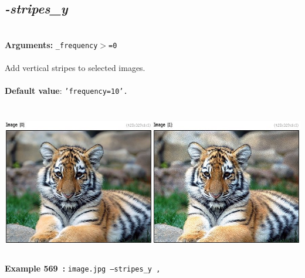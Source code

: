 \documentclass[a4paper,11pt,twoside]{book}
\begin{document}
\subsection{\emph{-stripes\_y} }\vspace*{-0.5em}
~\\\textbf{Arguments: } 
{\small \texttt{\_frequency$>$=0}}\\~\\
Add vertical stripes to selected images.
~\\~\\\textbf{Default value}: {\small \texttt{'frequency=10'.}}
\begin{center}\includegraphics[keepaspectratio=true,height=7cm,width=\textwidth]{img/gmic_def569.jpg}\\
{\footnotesize \textbf{Example 569~:} \texttt{image.jpg --stripes\_y ,}}
\end{center}
\end{document}
